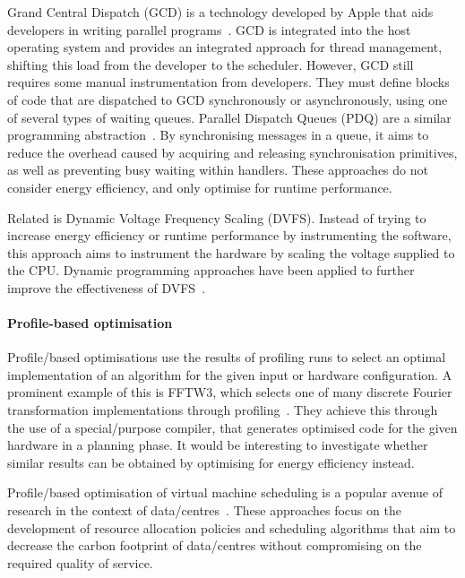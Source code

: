 Grand Central Dispatch (GCD) is a technology developed by Apple that aids developers in writing parallel programs~\cite{geeraerts2013queue,nutting2014grand,sakamoto2012grand}.
GCD is integrated into the host operating system and provides an integrated approach for thread management, shifting this load from the developer to the scheduler.
However, GCD still requires some manual instrumentation from developers.
They must define blocks of code that are dispatched to GCD synchronously or asynchronously, using one of several types of waiting queues.
Parallel Dispatch Queues (PDQ) are a similar programming abstraction~\cite{falsafi1999parallel}.
By synchronising messages in a queue, it aims to reduce the overhead caused by acquiring and releasing synchronisation primitives, as well as preventing busy waiting within handlers.
These approaches do not consider energy efficiency, and only optimise for runtime performance.

Related is Dynamic Voltage Frequency Scaling (DVFS).
Instead of trying to increase energy efficiency or runtime performance by instrumenting the software, this approach aims to instrument the hardware by scaling the voltage supplied to the CPU.
Dynamic programming approaches have been applied to further improve the effectiveness of DVFS~\cite{hajiamini2020dynamic}.

\paragraph{Profile-based optimisation}
Profile\-/based optimisations use the results of profiling runs to select an optimal implementation of an algorithm for the given input or hardware configuration.
A prominent example of this is FFTW3, which selects one of many discrete Fourier transformation implementations through profiling~\cite{frigo2005design}.
They achieve this through the use of a special\-/purpose compiler, that generates optimised code for the given hardware in a planning phase.
It would be interesting to investigate whether similar results can be obtained by optimising for energy efficiency instead.

Profile\-/based optimisation of virtual machine scheduling is a popular avenue of research in the context of data\-/centres~\cite{ding2017profile,buyya2010energy,dai2016energy,minarolli2011utility}.
These approaches focus on the development of resource allocation policies and scheduling algorithms that aim to decrease the carbon footprint of data\-/centres without compromising on the required quality of service.

